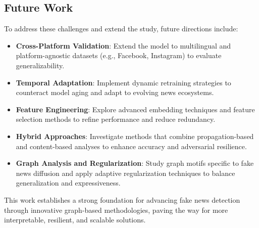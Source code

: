 \documentclass[sigconf,nonacm]{acmart}
\begin{document}
\subsection*{Future Work}
To address these challenges and extend the study, future directions include:
\begin{itemize}
    \item \textbf{Cross-Platform Validation}: Extend the model to multilingual and platform-agnostic datasets (e.g., Facebook, Instagram) to evaluate generalizability.
    \item \textbf{Temporal Adaptation}: Implement dynamic retraining strategies to counteract model aging and adapt to evolving news ecosystems.
    \item \textbf{Feature Engineering}: Explore advanced embedding techniques and feature selection methods to refine performance and reduce redundancy.
    \item \textbf{Hybrid Approaches}: Investigate methods that combine propagation-based and content-based analyses to enhance accuracy and adversarial resilience.
    \item \textbf{Graph Analysis and Regularization}: Study graph motifs specific to fake news diffusion and apply adaptive regularization techniques to balance generalization and expressiveness.
\end{itemize}

This work establishes a strong foundation for advancing fake news detection through innovative graph-based methodologies, paving the way for more interpretable, resilient, and scalable solutions.



\end{document}
